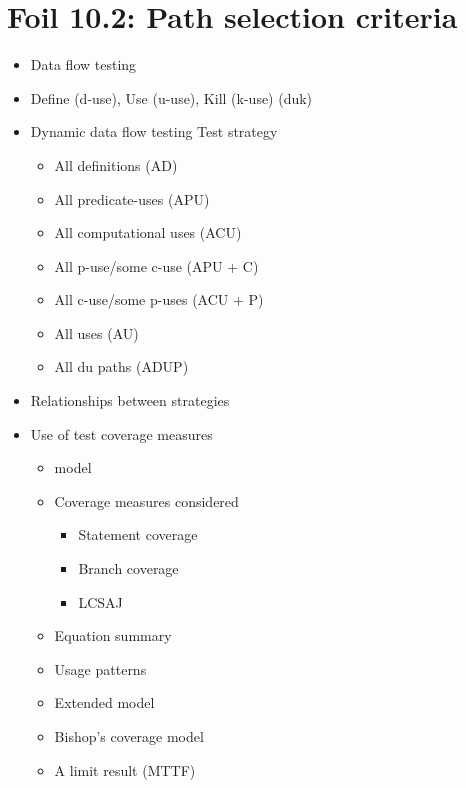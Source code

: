 	\section{Foil 10.2: Path selection criteria}
		\begin{itemize}
			\item Data flow testing
			\item Define (d-use), Use (u-use), Kill (k-use) (duk)
			\item Dynamic data flow testing Test strategy
				\begin{itemize}
					\item All definitions (AD)
					\item All predicate-uses (APU)
					\item All computational uses (ACU)
					\item All p-use/some c-use (APU + C)
					\item All c-use/some p-uses (ACU + P)
					\item All uses (AU)
					\item All du paths (ADUP)
				\end{itemize}
			\item Relationships between strategies
			\item Use of test coverage measures
				\begin{itemize}
					\item model
					\item Coverage measures considered
						\begin{itemize}
							\item Statement coverage
							\item Branch coverage
							\item LCSAJ
						\end{itemize}
					\item Equation summary
					\item Usage patterns
					\item Extended model
					\item Bishop's coverage model
					\item A limit result (MTTF)
				\end{itemize}
		\end{itemize}

